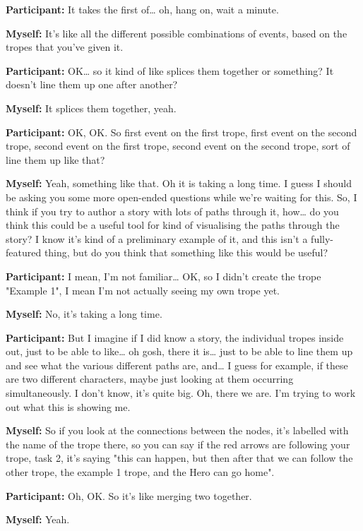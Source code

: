 \documentclass[11pt]{report}
\begin{document}
\begin{linenumbers}
\textbf{Participant:} It takes the first of\ldots{} oh, hang on, wait a minute.

\textbf{Myself:} It's like all the different possible combinations of events, based on the tropes that you've given it.

\textbf{Participant:} OK\ldots{} so it kind of like splices them together or something? It doesn't line them up one after another?

\textbf{Myself:} It splices them together, yeah.

\textbf{Participant:} OK, OK. So first event on the first trope, first event on the second trope, second event on the first trope, second event on the second trope, sort of line them up like that?

\textbf{Myself:} Yeah, something like that. Oh it is taking a long time. I guess I should be asking you some more open-ended questions while we're waiting for this. So, I think if you try to author a story with lots of paths through it, how\ldots{} do you think this could be a useful tool for kind of visualising the paths through the story? I know it's kind of a preliminary example of it, and this isn't a fully-featured thing, but do you think that something like this would be useful?

\textbf{Participant:} I mean, I'm not familiar\ldots{} OK, so I didn't create the trope "Example 1", I mean I'm not actually seeing my own trope yet.

\textbf{Myself:} No, it's taking a long time.

\textbf{Participant:} But I imagine if I did know a story, the individual tropes inside out, just to be able to like\ldots{} oh gosh, there it is\ldots{} just to be able to line them up and see what the various different paths are, and\ldots{} I guess for example, if these are two different characters, maybe just looking at them occurring simultaneously. I don't know, it's quite big. Oh, there we are. I'm trying to work out what this is showing me.

\textbf{Myself:} So if you look at the connections between the nodes, it's labelled with the name of the trope there, so you can say if the red arrows are following your trope, task 2, it's saying "this can happen, but then after that we can follow the other trope, the example 1 trope, and the Hero can go home".

\textbf{Participant:} Oh, OK. So it's like merging two together.

\textbf{Myself:} Yeah.


\end{linenumbers}
\end{document}
